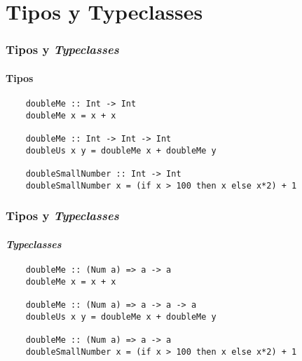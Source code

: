 \section{Tipos y Typeclasses}
\begin{frame}[fragile]
  \frametitle{Tipos y \emph{Typeclasses}}
  \framesubtitle{Tipos}
  \begin{verbatim}
    doubleMe :: Int -> Int
    doubleMe x = x + x

    doubleMe :: Int -> Int -> Int
    doubleUs x y = doubleMe x + doubleMe y

    doubleSmallNumber :: Int -> Int
    doubleSmallNumber x = (if x > 100 then x else x*2) + 1
  \end{verbatim}
\end{frame}

\begin{frame}[fragile]
  \frametitle{Tipos y \emph{Typeclasses}}
  \framesubtitle{\emph{Typeclasses}}
  \begin{verbatim}
    doubleMe :: (Num a) => a -> a
    doubleMe x = x + x

    doubleMe :: (Num a) => a -> a -> a
    doubleUs x y = doubleMe x + doubleMe y

    doubleMe :: (Num a) => a -> a
    doubleSmallNumber x = (if x > 100 then x else x*2) + 1
  \end{verbatim}
\end{frame}